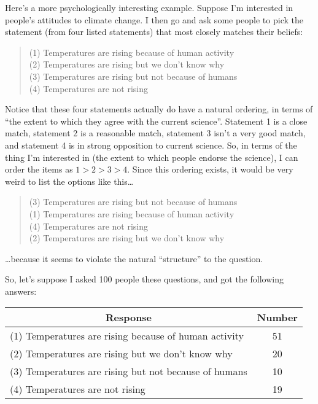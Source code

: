 Here's a more psychologically interesting example. Suppose I'm interested in people's attitudes to climate change. I then go and ask some people to pick the statement (from four listed statements) that most closely matches their beliefs:

\begin{quote}
(1) Temperatures are rising because of human activity \\
(2) Temperatures are rising but we don't know why \\
(3) Temperatures are rising but not because of humans \\
(4) Temperatures are not rising
\end{quote}

Notice that these four statements actually do have a natural ordering, in terms of ``the extent to which they agree with the current science''. Statement 1 is a close match, statement 2 is a reasonable match, statement 3 isn't a very good match, and statement 4 is in strong opposition to current science. So, in terms of the thing I'm interested in (the extent to which people endorse the science), I can order the items as $1 > 2 > 3 > 4$. Since this ordering exists,  it would be very weird to list the options like this\ldots
\begin{quote}
(3) Temperatures are rising but not because of humans \\
(1) Temperatures are rising because of human activity \\
(4) Temperatures are not rising\\
(2) Temperatures are rising but we don't know why 
\end{quote}
\ldots because it seems to violate the natural ``structure'' to the question. 

So, let's suppose I asked 100 people these questions, and got the following answers:

 \vspace*{10pt}
\begin{tabular}{lc}
\multicolumn{1}{c}{Response} & Number \\ \hline
(1) Temperatures are rising because of human activity & 51\\
(2) Temperatures are rising but we don't know why  & 20 \\
(3) Temperatures are rising but not because of humans & 10 \\
(4) Temperatures are not rising & 19 \\ \hline
\end{tabular}
 \vspace*{10pt}

